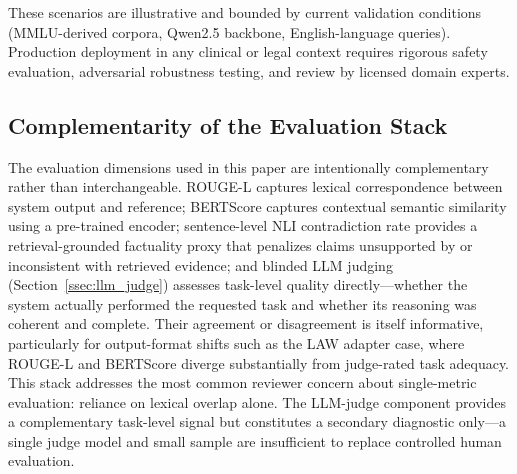\documentclass[a4paper,fleql,doubleblind]{cas-sc}
\begin{document}
These scenarios are illustrative and bounded by current validation conditions
(MMLU-derived corpora, Qwen2.5 backbone, English-language queries).
Production deployment in any clinical or legal context requires rigorous safety
evaluation, adversarial robustness testing, and review by licensed domain experts.

\subsection{Complementarity of the Evaluation Stack}
\label{ssec:eval_stack}

The evaluation dimensions used in this paper are intentionally complementary rather
than interchangeable.
ROUGE-L captures lexical correspondence between system output and reference;
BERTScore captures contextual semantic similarity using a pre-trained encoder;
sentence-level NLI contradiction rate provides a retrieval-grounded factuality proxy
that penalizes claims unsupported by or inconsistent with retrieved evidence;
and blinded LLM judging (Section~\ref{ssec:llm_judge}) assesses task-level
quality directly---whether the system actually performed the requested task and
whether its reasoning was coherent and complete.
Their agreement or disagreement is itself informative, particularly for
output-format shifts such as the LAW adapter case, where ROUGE-L and BERTScore
diverge substantially from judge-rated task adequacy.
This stack addresses the most common reviewer concern about single-metric
evaluation: reliance on lexical overlap alone.
The LLM-judge component provides a complementary task-level signal but
constitutes a secondary diagnostic only---a single judge model and small
sample are insufficient to replace controlled human evaluation.

\end{document}
